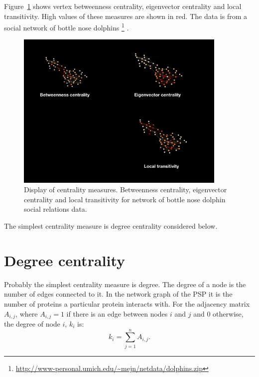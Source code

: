 Figure~\ref{fig:dolphin} shows vertex betweenness centrality, eigenvector centrality and local transitivity. High values of these measures are shown in red. The data is from a social network of bottle nose dolphins \footnote{\url{http://www-personal.umich.edu/~mejn/netdata/dolphins.zip}} \cite{lusseau2003bottlenose} .

\begin{figure}
    \centering
    \includegraphics[width=0.9\textwidth]{images/centrality2.002.png}
    \caption{Display of centrality measures. Betweenness centrality, eigenvector centrality and local transitivity for network of bottle nose dolphin social relations data. \cite{lusseau2003bottlenose}}
    \label{fig:dolphin}
\end{figure}

The simplest centrality measure is degree centrality considered below. 

\section{Degree centrality}
\label{sec:degree}

Probably the simplest centrality measure is degree. 
The degree of a node is the number of edges connected to it. In the network graph of the PSP it is the number of proteins a particular protein interacts with.
For the adjacency matrix $A_{i,j}$, where $A_{i,j}=1$  if there is an edge between nodes $i$ and $j$ and 0 otherwise, the degree of node $i$, $k_i$ is\cite{boccaletti2006complex}:
\begin{equation}
k_i = \sum_{j=1}^n A_{i,j}.
\label{Equation:Degree_from_adjacency}
\end{equation}

